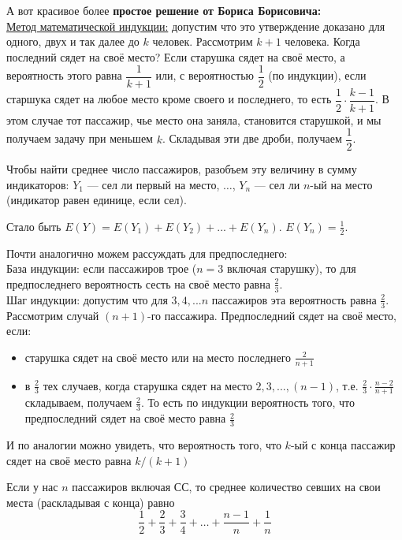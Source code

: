 \documentclass[a4paper,12pt]{article}
\theoremstyle{plain}                         %
\theoremstyle{definition}                  %
\theoremstyle{remark}                      %
\begin{document}
\begin{enumerate}
А вот красивое более \textbf{простое решение от Бориса Борисовича:}\\
\underline{Метод математической индукции:} допустим что это утверждение доказано для одного, двух и так далее до $k$ человек. Рассмотрим $k+1$ человека. Когда последний сядет на своё место? Если старушка сядет на своё место, а вероятность этого равна $\dfrac{1}{k+1}$ или, с вероятностью $\dfrac{1}{2}$ (по индукции), если старшука сядет на любое место кроме своего и последнего, то есть $\dfrac{1}{2}\cdot\dfrac{k-1}{k+1}$. В этом случае тот\vspace{0.2cm} пассажир, чье место  она заняла, становится старушкой, и мы получаем задачу при меньшем $k$. Складывая эти две дроби, получаем $\dfrac{1}{2} $.

Чтобы найти среднее число пассажиров, разобъем эту величину в сумму индикаторов: $Y_1$ --- сел ли первый на место, $\dots$, $Y_n$ --- сел ли $n$-ый на место (индикатор равен единице, если сел). 

Стало быть $E(Y)=E(Y_1)+E(Y_2)+...+E(Y_n)$. $E(Y_n)=\frac{1}{2}$.

Почти аналогично можем рассуждать для предпоследнего:\\
База индукции: если пассажиров трое ($n=3$ включая старушку), то для предпоследнего вероятность сесть на своё место равна $\frac{2}{3}$.\\
Шаг индукции: допустим что для $3, 4, ... n$ пассажиров эта вероятность равна $\frac{2}{3}$.
Рассмотрим случай $(n+1)$-го пассажира. 
Предпоследний сядет на своё место, если:

\renewcommand{\labelitemi}{\textbullet}

\begin{itemize}
\item старушка сядет на своё место или на место последнего $\frac{2}{n+1}$
\item в $\frac{2}{3}$ тех случаев, когда старушка сядет на место $2, 3, ..., (n-1)$, т.е. $\frac{2}{3}\cdot \frac{n-2}{n+1}$
складываем, получаем $\frac{2}{3}$.
То есть по индукции вероятность того, что предпоследний сядет на своё место равна $\frac{2}{3}$
\end{itemize}
И по аналогии можно увидеть, что вероятность того, что $k$-ый с конца пассажир сядет на своё место равна $k/(k+1)$

Если у нас $n$ пассажиров включая СС, то среднее количество севших на свои места (раскладывая с конца) равно $$\frac{1}{2}+\frac{2}{3}+\frac{3}{4}+\dots+\frac{n-1}{n}+\frac{1}{n}$$

\end{enumerate}
\end{document}
